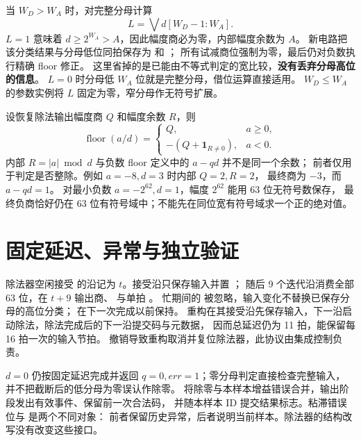 当 $W_D>W_A$ 时，对完整分母计算
\begin{equation}
L=\bigvee d[W_D-1:W_A].
\end{equation}
$L=1$ 意味着 $d\ge2^{W_A}>A$，因此幅度商必为零，内部幅度余数为 $A$。
新电路把该分类结果与分母低位同拍保存为  和 ；
所有试减商位强制为零，最后仍对负数执行精确 floor 修正。
这里省掉的是已能由不等式判定的宽比较，\textbf{没有丢弃分母高位的信息}。
$L=0$ 时分母低 $W_A$ 位就是完整分母，借位运算直接适用。
$W_D\le W_A$ 的参数实例将 $L$ 固定为零，窄分母作无符号扩展。

设恢复除法输出幅度商 $Q$ 和幅度余数 $R$，则
\begin{equation}
\operatorname{floor}(a/d)=
\begin{cases}
 Q,&a\ge0,\\
 -(Q+\mathbf{1}_{R\ne0}),&a<0.
\end{cases}
\end{equation}
内部 $R=|a|\bmod d$ 与负数 floor 定义中的 $a-qd$ 并不是同一个余数；
前者仅用于判定是否整除。例如 $a=-8,d=3$ 时内部 $Q=2,R=2$，
最终商为 $-3$，而 $a-qd=1$。
对最小负数 $a=-2^{62},d=1$，幅度 $2^{62}$ 能用 63 位无符号数保存，
最终负商恰好仍在 63 位有符号域中；不能先在同位宽有符号域求一个正的绝对值。

\section{固定延迟、异常与独立验证}
除法器空闲接受  的沿记为 $t$。接受沿只保存输入并置 ；
随后 9 个迭代沿消费全部 63 位，在 $t+9$ 输出商、 与单拍 。
忙期间的  被忽略，输入变化不替换已保存分母的高位分类；
 在下一次完成以前保持。
重构在其接受沿先保存输入，下一沿启动除法，除法完成后的下一沿提交码与元数据，
因而总延迟仍为 11 拍，能保留每 16 拍一次的输入节拍。
 撤销导致重构取消并复位除法器，此协议由集成控制负责。

$d=0$ 仍按固定延迟完成并返回 $q=0,err=1$；零分母判定直接检查完整输入，
并不把截断后的低分母为零误认作除零。
 将除零与本样本增益错误合并，输出阶段发出有效事件、保留前一次合法码，
并随本样本 ID 提交结果标志。粘滞错误位与  是两个不同对象：
前者保留历史异常，后者说明当前样本。除法器的结构改写没有改变这些接口。

